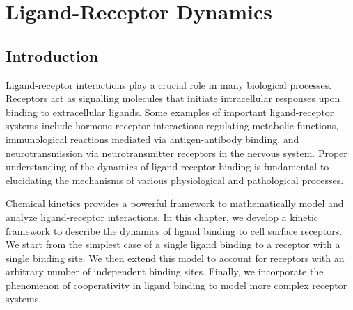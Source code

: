 \chapter{Ligand-Receptor Dynamics}
\label{ch24} 



\section{Introduction}

Ligand-receptor interactions play a crucial role in many biological processes. Receptors act as signalling molecules that initiate intracellular responses upon binding to extracellular ligands. Some examples of important ligand-receptor systems include hormone-receptor interactions regulating metabolic functions, immunological reactions mediated via antigen-antibody binding, and neurotransmission via neurotransmitter receptors in the nervous system. Proper understanding of the dynamics of ligand-receptor binding is fundamental to elucidating the mechanisms of various physiological and pathological processes.

Chemical kinetics provides a powerful framework to mathematically model and analyze ligand-receptor interactions. In this chapter, we develop a kinetic framework to describe the dynamics of ligand binding to cell surface receptors. We start from the simplest case of a single ligand binding to a receptor with a single binding site. We then extend this model to account for receptors with an arbitrary number of independent binding sites. Finally, we incorporate the phenomenon of cooperativity in ligand binding to model more complex receptor systems.

